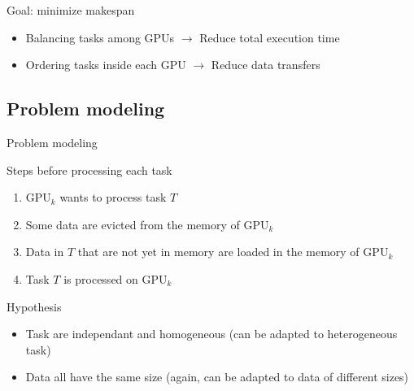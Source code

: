 \documentclass{libs/ufc_format}
\newcommand{\evict}{\ensuremath{\mathcal{V}}\xspace}
\newcommand{\GPU}[1]{\ensuremath{\mathrm{GPU}_{#1}}\xspace}
\begin{document}
\begin{frame}{Goal: minimize makespan}
	\begin{alertblock}{}
		\begin{itemize}
			\item Balancing tasks among GPUs $\rightarrow$ Reduce total execution time
			\item Ordering tasks inside each GPU $\rightarrow$ Reduce data transfers
		\end{itemize}
	\end{alertblock}
\end{frame}

\subsection{Problem modeling}
\begin{frame}{Problem modeling}
\begin{block}{Steps before processing each task}
	\begin{enumerate}
		\item $\GPU{k}$ wants to process task $T$
		\item Some data are evicted from the memory of $\GPU{k}$
		\item Data in $T$ that are not yet in memory are loaded in the memory of $\GPU{k}$
		\item Task $T$ is processed on $\GPU{k}$
	\end{enumerate}
\end{block}
\begin{block}{Hypothesis}
	\begin{itemize}
		\item Task are independant and homogeneous (can be adapted to heterogeneous task)
		\item Data all have the same size (again, can be adapted to data of different sizes)
	\end{itemize}
\end{block}
\end{frame}
\end{document}
